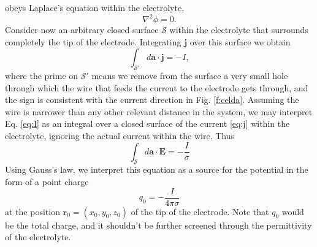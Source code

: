 \documentclass[review,sort&compress]{cas-sc}
\begin{document}
obeys Laplace's equation within the electrolyte,
\begin{equation}
  \label{eq:laplace}
\nabla^{2} \phi=0.
\end{equation}
Consider now an arbitrary closed surface
$\mathcal S$
within the electrolyte that surrounds completely the tip of the
electrode. Integrating $ \bm j$ over this surface we obtain
\begin{equation}
  \label{eq:I}
\int_{\mathcal S'} d\bm a \cdot \bm j = -I,
\end{equation}
where the prime on $\mathcal S'$ means we remove from the surface a
very small hole through which the wire that feeds the current to the
electrode gets
through, and the sign is consistent with the current direction in
Fig. \ref{f:celda}. Assuming the wire is narrower than any other relevant
distance in the system, we may interpret Eq. \eqref{eq:I} as an
integral over a closed surface of the current \eqref{eq:j} within the
electrolyte, ignoring the actual current within the wire. Thus
\begin{equation}
  \label{eq:gauss}
  \int_{\mathcal S} d\bm a \cdot \bm E = -\frac{I}{\sigma}
\end{equation}
Using Gauss's law, we interpret this equation as a source for the
potential in the form of a point charge
\begin{equation}
  q_0 = -\frac{I}{4 \pi \sigma}
\end{equation}
at the position $\bm r_0=(x_0, y_0, z_0)$ of the
tip of the electrode. Note that $q_0$ would be the total charge,
and it shouldn't be further screened through the permittivity of the
electrolyte.
\end{document}
